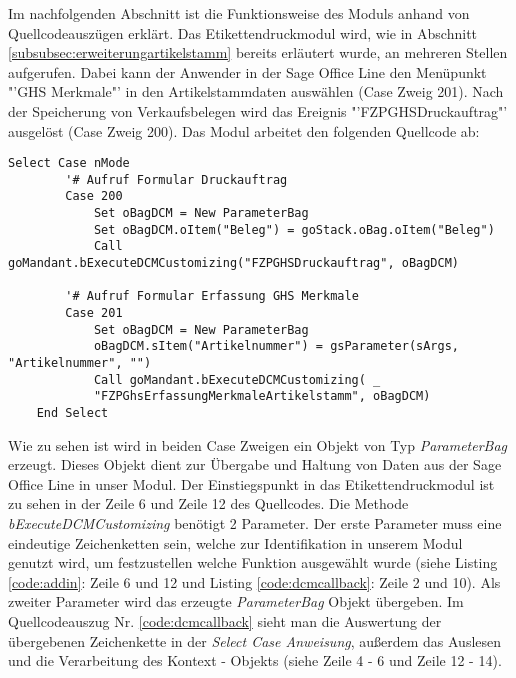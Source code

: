 Im nachfolgenden Abschnitt ist die Funktionsweise des Moduls anhand von Quellcodeauszügen
erklärt. Das Etikettendruckmodul wird, wie in Abschnitt \ref{subsubsec:erweiterungartikelstamm}
bereits erläutert wurde, an mehreren Stellen aufgerufen. Dabei kann der Anwender
in der Sage Office Line den Menüpunkt "'GHS Merkmale"' in den Artikelstammdaten auswählen
(Case Zweig 201). Nach der Speicherung von Verkaufsbelegen wird das Ereignis 
"'FZPGHSDruckauftrag"' ausgelöst (Case Zweig 200). Das Modul arbeitet den folgenden Quellcode ab:
\newline
\newline
\newline
\begin{lstlisting}[style=A, caption=Aufruf Formulare aus Sage Office Line (COM),
label={code:addin}]
    Select Case nMode
        '# Aufruf Formular Druckauftrag
        Case 200
            Set oBagDCM = New ParameterBag
            Set oBagDCM.oItem("Beleg") = goStack.oBag.oItem("Beleg")
            Call goMandant.bExecuteDCMCustomizing("FZPGHSDruckauftrag", oBagDCM)
            
        '# Aufruf Formular Erfassung GHS Merkmale
        Case 201
            Set oBagDCM = New ParameterBag
            oBagDCM.sItem("Artikelnummer") = gsParameter(sArgs, "Artikelnummer", "")
            Call goMandant.bExecuteDCMCustomizing( _
            "FZPGhsErfassungMerkmaleArtikelstamm", oBagDCM)
    End Select
\end{lstlisting}

\noindent
Wie zu sehen ist wird in beiden Case Zweigen ein Objekt von Typ \emph{ParameterBag} erzeugt. 
Dieses Objekt dient zur Übergabe und Haltung von Daten aus der Sage Office Line in unser 
Modul. Der Einstiegspunkt in das Etikettendruckmodul ist zu sehen in der Zeile 6 und 
Zeile 12 des Quellcodes. Die Methode \emph{bExecuteDCMCustomizing} benötigt 2 Parameter. 
Der erste Parameter muss eine eindeutige Zeichenketten sein, welche zur Identifikation in
unserem Modul genutzt wird, um festzustellen welche Funktion ausgewählt wurde (siehe Listing
\ref{code:addin}: Zeile 6 und 12 und Listing \ref{code:dcmcallback}: Zeile 2 und 10). Als 
zweiter Parameter wird das erzeugte \emph{ParameterBag} Objekt übergeben. Im 
Quellcodeauszug Nr. \ref{code:dcmcallback} sieht man die Auswertung der übergebenen
Zeichenkette in der \emph{Select Case Anweisung}, außerdem das Auslesen und die Verarbeitung des
Kontext - Objekts (siehe Zeile 4 - 6 und Zeile 12 - 14).

